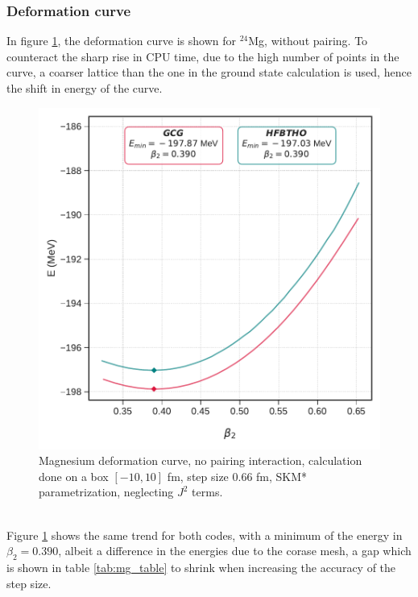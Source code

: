 \subsubsection{Deformation curve}
In figure \ref{fig:mg_no_pair_deformation}, the deformation curve is shown for $^{24}$Mg, without pairing. To counteract the sharp rise in CPU time, due to the high number of points in the curve, a coarser lattice than the one in the ground state calculation is used, hence the shift in energy of the curve.
\begin{figure}[h]
  \centering
  \includegraphics[width=0.8\linewidth]{Images/mg_nopair_curve.pdf}
  \caption{Magnesium deformation curve, no pairing interaction, calculation done on a box $[-10, 10]$ fm, step size 0.66 fm, SKM* parametrization, neglecting $J^2$ terms.}
  \label{fig:mg_no_pair_deformation}
\end{figure}
\\Figure \ref{fig:mg_no_pair_deformation} shows the same trend for both codes, with a minimum of the energy in $\beta_2=0.390$, albeit a difference in the energies due to the corase mesh, a gap which is shown in table \ref{tab:mg_table} to shrink when increasing the accuracy of the step size.